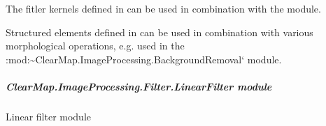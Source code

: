 \documentclass[letterpaper,10pt,english]{sphinxmanual}
\begin{document}
The fitler kernels defined in {\hyperref[api/ClearMap.ImageProcessing.Filter:module-ClearMap.ImageProcessing.Filter.FilterKernel]{\emph{}}}
can be used in combination with the 
module.

Structured elements defined in
 can be used in
combination with various morphological operations, e.g. used in the
:mod:\textasciitilde{}ClearMap.ImageProcessing.BackgroundRemoval{}` module.


\subparagraph{ClearMap.ImageProcessing.Filter.LinearFilter module}
\label{api/ClearMap.ImageProcessing.Filter:module-ClearMap.ImageProcessing.Filter.LinearFilter}\label{api/ClearMap.ImageProcessing.Filter:clearmap-imageprocessing-filter-linearfilter-module}
Linear filter module
\end{document}
